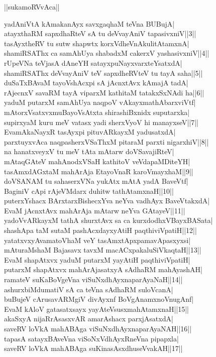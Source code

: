 \documentclass{article}
\begin{document}
\begin{center}
||sukamoRVvAca||
\end{center}

yadAniVtA kAmakanAyx savxgaqhaM teVna BUBujA|\\
atayxthaRM sapxdhaRteV sA tu deVvayAniV tapasivxniV||3||\\
tasAyxtheRV tu sutw shapwtx korxVdheVnAkulitAtamxnA|\\
shamiRSAThx ca samAhUya shabadxM cakerxV yashasivxniV||4||\\
rUpeVNa teVjasA dAneYH satayxpuNayxvarxteYsatxdA|\\
shamiRSAThx deVvayAniV teV sapxdheRVteV tu tayA saha||5||\\
duSaTxBAvaM tayoVshAcxpi sA jAcnxtAvx kAmajA tadA|\\
rAjecnxV savaRM tayA viparxM kathitaM tatakxSxNAdi ha||6||\\
yaduM putarxM samAhUya naqpoV vAkayxmathAbarxviVtf|\\
mAtorxVsatxvxmuBayoVsAtxta shirashiBxnidx suputarxka|\\
supirxyaM kuru meV vatasx yadi sherxVyoV hi manayxseV||7||\\
EvamAkaNayxR tasAyxpi pituvARkayxM yadusatxdA|\\
parxtuyxvAca naqpasherxVSaThxM pitaraM parxti nigarxhiV||8||\\
na hanatxveyxV tu meV tAta mAtarw doVSavajiRteV|\\
mAtaqGAteV mahAnodxVSaH kathitoV veVdapaMDiteYH|\\
tasAmxdAGxtaM mahArAja EtayoVnaR karoVmayxhaM||9||\\
doVSANAM tu sahaserxVNa yukAtx mAtA yadA BaveVtf|\\
BaginiV cApi rAjeVMdarx duhitw tathAtamxnaH||10||\\
puterxYshacx BArxtarxBishecxYva neYva vadhAyx BaveVtakxdA|\\
EvaM jAcnxtAvx mahArAja mAtarw neYva GAtayeV||11||\\
yadoVvARkayxM tathA shurxtAvx sa ca kurxdodhxVBayxBASata|\\
shashApa taM sutaM pashAcxdayxyAtiH paqthiviVpatiH||12||\\
yatatxvxyAvamatoVhaM veY tasAmxtApxpamavApasxyxsi|\\
mAturaMshaM Bajasavx tavxM macACxpakaluSiVkaqtaH||13||\\
EvaM shapAtxvx yaduM putarxM yayAtiH paqthiviVpatiH|\\
putarxM shapAtxvx mahArAjasatxyA sAdhaRM mahAyashAH|\\
ramateV suKaBoVgeVna viSuNxdhAyxnaparAyaNaH||14||\\
ashurxbiMdumatiV sA ca teVna sAdhaRM suloVcanA|\\
buBujeV cArusavARMgiV divAyxnf BoVgAnamxnoVnugAnf|\\
EvaM kAloV gatasatxsayx yayAteVsusxmahAtamxnaH||15||\\
akaSxyA nijaRrAsasxvAR amarAshacx parxjAsatxdA|\\
saveRV loVkA mahABAga viSuNxdhAyxnaparAyaNAH||16||\\
tapasA satayxBAveVna viSoNxVdhAyxRneVna pipapxla|\\
saveRV loVkA mahABAga suKinasAsxdhuseVvakAH||17||
\end{document}
